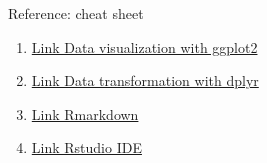 \documentclass[
  ignorenonframetext,
]{beamer}
\begin{document}
\begin{frame}{Reference: cheat sheet}
\protect\hypertarget{reference-cheat-sheet}{}
\begin{enumerate}[<+->]
[1)]
\item
  \href{https://github.com/rstudio/cheatsheets/blob/main/data-visualization.pdf}{Link
  Data visualization with ggplot2}
\item
  \href{https://github.com/rstudio/cheatsheets/blob/main/data-transformation.pdf}{Link
  Data transformation with dplyr}
\item
  \href{https://github.com/rstudio/cheatsheets/blob/main/rmarkdown.pdf}{Link
  Rmarkdown}
\item
  \href{https://github.com/rstudio/cheatsheets/blob/main/rstudio-ide.pdf}{Link
  Rstudio IDE}
\end{enumerate}
\end{frame}
\end{document}
